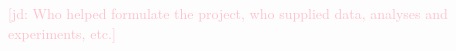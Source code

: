 \documentclass[OpenMind]{stjour}
\newcommand{\jd}[1]{\textcolor{Pink}{[jd: #1]}}
\begin{document}
\authorcontributions 
\jd{Who helped formulate the project, who supplied data, analyses and
experiments, etc.}







%


\end{document}
